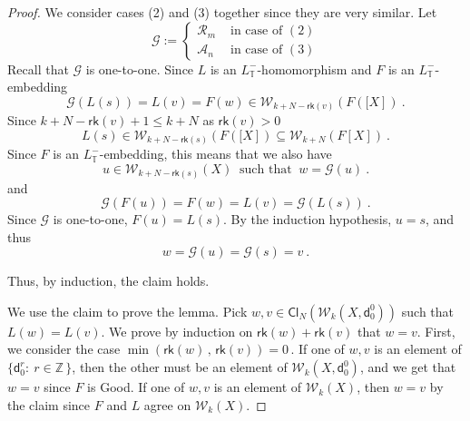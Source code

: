 \documentclass[10pt,a4paper]{amsart}
\begin{document}
\begin{proof}
We consider  cases    (2)  and  (3)  together since they are very similar. 
Let   
\[
\mathcal{G} :=   \begin{cases}
\mathcal{R}_m      &    \mbox{ in case of  }  (2) 
\\
\mathcal{A}_n      &    \mbox{ in case of  }  (3) 
\end{cases}
\]
Recall that    $  \mathcal{G}   $  is one-to-one. 
Since  $L$ is an $L_{  \mathbb{T} }^-  $-homomorphism  and  $F$  is  an   $L_{  \mathbb{T} }^-  $-embedding
\[
\mathcal{G}  \left(   L(s)  \right)     =   
 L(v)  = F(w)   \in  
 \mathcal{W}_{k + N- \mathsf{rk} \left(   v \right)  }  \left(   F  \left([ X  \right]   \right)   
 \     . 
\]
Since  $   k + N- \mathsf{rk}  \left(   v \right)  +1  \leq  k+N $  as  $   \mathsf{rk}  \left(   v \right)   >  0  $
\[
  L(s)  \in  
   \mathcal{W}_{k + N- \mathsf{rk} \left(   s \right)  }  \left(   F  \left([ X  \right]   \right)   
  \subseteq     \mathcal{W}_{ k + N  }  \left(     F  \left[  X   \right]   \right)  
  \      .
  \]
Since  $  F$ is an  $L_{  \mathbb{T} }^-  $-embedding, this means that we also have  
\[
u     \in   \mathcal{W}_{k + N -  \mathsf{rk} \left(   s \right)  }  \left( X  \right)    
 \   \mbox{ such that  }    \   
 w  =   \mathcal{G}   \left(  u  \right) 
   \      .
   \]
and   
\[
\mathcal{G}  \left(   F(u)  \right)     =   
 F(w)  =  L(v)    = 
\mathcal{G}  \left(   L(s)  \right)     
\         .
\]
Since  $   \mathcal{G} $ is one-to-one, $  F(u)  =  L(s)  $. 
By the induction hypothesis,   $u =  s $,     and thus  
\[
  w  =    \mathcal{G} \left(  u   \right)     =       \mathcal{G}   \left(  s   \right)     =   v  
  \     .
  \]




Thus,  by induction,   the claim holds. 



 
 
 
 We use the claim to prove the lemma. 
Pick    $  w,  v    \in   \mathsf{Cl}_{N}  \left(  \mathcal{W}_{k}  \left( X ,  \mathsf{d}^0_0  \right)   \right) $  such that  $  L(w)  =  L(v )  $. 
We prove by induction on  $  \mathsf{rk}  \left( w  \right)  +   \mathsf{rk}  \left( v  \right)   $  that  $  w  = v $. 
First,  we  consider the case  $  \min  \left(   \mathsf{rk}  \left( w  \right)     \,  ,  \,    \mathsf{rk}  \left( v  \right)     \right)  =  0   \,    $.
If    one of  $  w,  v  $  is an element of  $  \big\{  \mathsf{d}^r_0  :   \  r  \in  \mathbb{Z}  \,  \big\}  $, 
then the other must be an element of  $  \mathcal{W}_{k}  \left( X ,  \mathsf{d}^0_0  \right)   $,   
and we get  that     $  w  = v  $   since   $F$ is   \textsf{Good}. 
If  one of     $  w,  v  $   is   an element  of    $  \mathcal{W}_{k}  \left( X  \right)   $,  
then  $   w   =   v  $  by the claim  since  $F$ and $L$ agree on   $  \mathcal{W}_{k}  \left( X  \right)   $. 






\end{proof}
\end{document}
